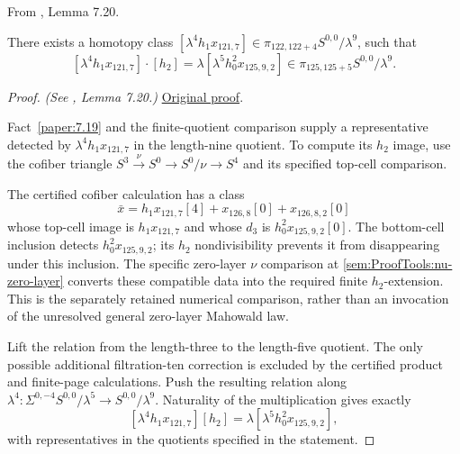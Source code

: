 \begin{lemma}
\label{paper:7.20}
From \cite{LWX126}, Lemma 7.20.\par
\label{lem:nuext125}
    There exists a homotopy class $[\lambda^4 h_1 x_{121,7}] \in \pi_{122,122+4}S^{0,0}/\lambda^9$, such that 
    $$[\lambda^4 h_1 x_{121,7}] \cdot [h_2] = \lambda [\lambda^5 h_0^2 x_{125,9,2}] \in \pi_{125,125+5} S^{0,0}/\lambda^9.$$


\end{lemma}
\begin{proof}
\textit{(See \cite{LWX126}, Lemma 7.20.)} \href{paper/main.tex.html#L2622}{Original proof}.

Fact~\ref{paper:7.19} and the finite-quotient comparison supply a representative detected by $\lambda^4h_1x_{121,7}$ in the length-nine quotient. To compute its $h_2$ image, use the cofiber triangle $S^3\xrightarrow{\nu}S^0\to S^0/\nu\to S^4$ and its specified top-cell comparison.

The certified cofiber calculation has a class
\[
 \bar x=h_1x_{121,7}[4]+x_{126,8}[0]+x_{126,8,2}[0]
\]
whose top-cell image is $h_1x_{121,7}$ and whose $d_3$ is $h_0^2x_{125,9,2}[0]$. The bottom-cell inclusion detects $h_0^2x_{125,9,2}$; its $h_2$ nondivisibility prevents it from disappearing under this inclusion. The specific zero-layer $\nu$ comparison at \ref{sem:ProofTools:nu-zero-layer} converts these compatible data into the required finite $h_2$-extension. This is the separately retained numerical comparison, rather than an invocation of the unresolved general zero-layer Mahowald law.

Lift the relation from the length-three to the length-five quotient. The only possible additional filtration-ten correction is excluded by the certified product and finite-page calculations. Push the resulting relation along $\lambda^4: \Sigma^{0,-4}S^{0,0}/\lambda^5\to S^{0,0}/\lambda^9$. Naturality of the multiplication gives exactly
\[
 [\lambda^4h_1x_{121,7}][h_2]
       =\lambda[\lambda^5h_0^2x_{125,9,2}],
\]
with representatives in the quotients specified in the statement.
\end{proof}
